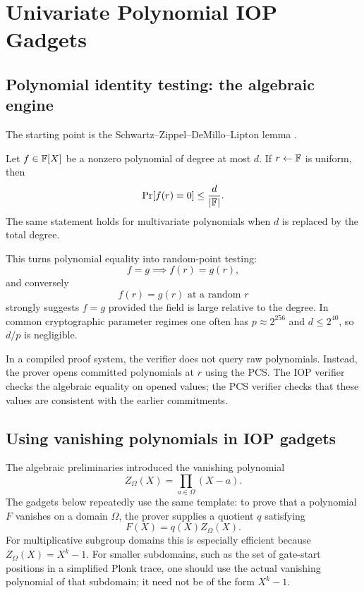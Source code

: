\section{Univariate Polynomial IOP Gadgets}
\label{sec:proof-gadgets}

\subsection{Polynomial identity testing: the algebraic engine}

The starting point is the Schwartz--Zippel--DeMillo--Lipton lemma \cite{DeMilloLipton1978,Schwartz1980,Zippel1979}.

\begin{lemma}
Let $f\in \mathbb{F}[X]$ be a nonzero polynomial of degree at most $d$. If $r\leftarrow \mathbb{F}$ is uniform, then
\[
\Pr[f(r)=0]\le \frac{d}{|\mathbb{F}|}.
\]
The same statement holds for multivariate polynomials when $d$ is replaced by the total degree.
\end{lemma}

This turns polynomial equality into random-point testing:
\[
    f=g \implies f(r)=g(r),
\]
and conversely
\[
    f(r)=g(r) \text{ at a random }r
\]
strongly suggests $f=g$ provided the field is large relative to the degree. In common cryptographic parameter regimes one often has $p\approx 2^{256}$ and $d\le 2^{40}$, so $d/p$ is negligible.

In a compiled proof system, the verifier does not query raw polynomials. Instead, the prover opens committed polynomials at $r$ using the PCS. The IOP verifier checks the algebraic equality on opened values; the PCS verifier checks that these values are consistent with the earlier commitments.

\subsection{Using vanishing polynomials in IOP gadgets}

The algebraic preliminaries introduced the vanishing polynomial
\[
    Z_\Omega(X)=\prod_{a\in\Omega}(X-a).
\]
The gadgets below repeatedly use the same template: to prove that a polynomial $F$ vanishes on a domain $\Omega$, the prover supplies a quotient $q$ satisfying
\[
    F(X)=q(X)Z_\Omega(X).
\]
For multiplicative subgroup domains this is especially efficient because $Z_\Omega(X)=X^k-1$. For smaller subdomains, such as the set of gate-start positions in a simplified Plonk trace, one should use the actual vanishing polynomial of that subdomain; it need not be of the form $X^k-1$.

